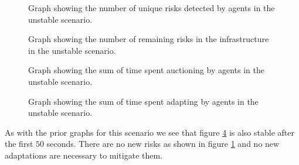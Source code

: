 \begin{figure}[H]
    \centering
        
    \caption{Graph showing the number of unique risks detected by agents in the unstable scenario.}
    \label{fig:risk-count-unstable}
\end{figure}

\begin{figure}[H]
    \centering
        
    \caption{Graph showing the number of remaining risks in the infrastructure in the unstable scenario.}
    \label{fig:risk-remaining-unstable}
\end{figure}


\begin{figure}[H]
    \centering
        
    \caption{Graph showing the sum of time spent auctioning by agents in the unstable scenario.}
    \label{fig:auctioning-time-unstable}
\end{figure}

\begin{figure}[H]
    \centering
        
    \caption{Graph showing the sum of time spent adapting by agents in the unstable scenario.}
    \label{fig:adapting-time-unstable}
\end{figure}

As with the prior graphs for this scenario we see that figure \ref{fig:adapting-time-unstable} is also stable after the first $50$ seconds. There are no new risks as shown in figure \ref{fig:risk-count-unstable} and no new adaptations are necessary to mitigate them. 
